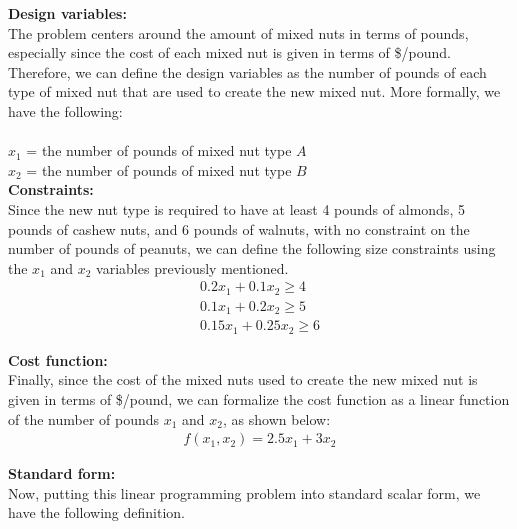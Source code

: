 \documentclass[11pt]{article}
\begin{document}
\begin{prob}{1}
\end{prob}
\begin{sol} 

\textbf{Design variables:} \\ 
The problem centers around the amount of mixed nuts in terms of pounds, especially since the cost of each mixed nut is given in terms of \$/pound. Therefore, we can define the design variables as the number of pounds of each type of mixed nut that are used to create the new mixed nut. More formally, we have the following: \\ \\
$x_{1}$ = the number of pounds of mixed nut type $A$ \\
$x_{2}$ = the number of pounds of mixed nut type $B$ \\

\textbf{Constraints:}  \\
Since the new nut type is required to have at least 4 pounds of almonds, 5 pounds of cashew nuts, and 6 pounds of walnuts, with no constraint on the number of pounds of peanuts, we can define the following size constraints using the $x_{1}$ and $x_{2}$ variables previously mentioned. 
\begin{eqnarray*}
0.2x_{1} + 0.1x_{2} \geq 4 \\
0.1x_{1} + 0.2x_{2} \geq 5 \\
0.15x_{1} + 0.25x_{2} \geq 6 
\end{eqnarray*}

\textbf{Cost function:} \\
Finally, since the cost of the mixed nuts used to create the new mixed nut is given in terms of \$/pound, we can formalize the cost function as a linear function of the number of pounds $x_{1}$ and $x_{2}$, as shown below:
\begin{eqnarray*}
f(x_{1},x_{2}) = 2.5x_{1} + 3x_{2}
\end{eqnarray*}

\textbf{Standard form:} \\
Now, putting this linear programming problem into standard scalar form, we have the following definition.  \\


\end{sol}
\end{document}
